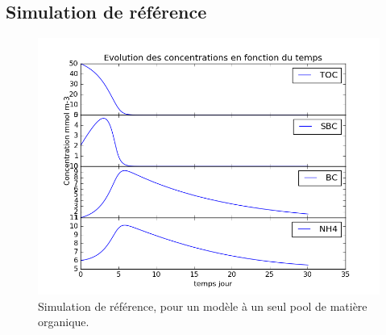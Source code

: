 \FloatBarrier
\subsection{Simulation de r\'ef\'erence}

\begin{figure}[h!]
  \includegraphics[width=\textwidth]{partie1/Ref.png}
  \caption{Simulation de r\'ef\'erence, pour un mod\`ele \`a un seul pool de mati\`ere organique.
  }
  \label{fig:partie1ref}
\end{figure}


